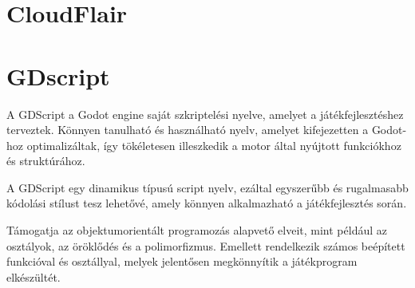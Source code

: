 




\section{CloudFlair}

\section{GDscript}
A GDScript a Godot engine saját szkriptelési nyelve, amelyet a játékfejlesztéshez terveztek. 
Könnyen tanulható és használható nyelv, amelyet kifejezetten a Godot-hoz optimalizáltak, így tökéletesen illeszkedik a motor által nyújtott funkciókhoz és struktúrához.

A GDScript egy dinamikus típusú script nyelv, ezáltal egyszerűbb és rugalmasabb kódolási stílust tesz lehetővé, amely könnyen alkalmazható a játékfejlesztés során.

Támogatja az objektumorientált programozás alapvető elveit, mint például az osztályok, az öröklődés és a polimorfizmus. Emellett rendelkezik számos beépített funkcióval és osztállyal, melyek jelentősen megkönnyítik a játékprogram elkészültét.
